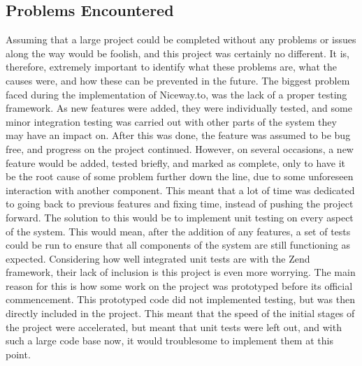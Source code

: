 \subsection{Problems Encountered}
\label{sec:problems}
Assuming that a large project could be completed without any problems or issues along the way would be foolish, and this project was certainly no different. It is, therefore, extremely important to identify what these problems are, what the causes were, and how these can be prevented in the future. The biggest problem faced during the implementation of Niceway.to, was the lack of a proper testing framework. As new features were added, they were individually tested, and some minor integration testing was carried out with other parts of the system they may have an impact on. After this was done, the feature was assumed to be bug free, and progress on the project continued. However, on several occasions, a new feature would be added, tested briefly, and marked as complete, only to have it be the root cause of some problem further down the line, due to some unforeseen interaction with another component. This meant that a lot of time was dedicated to going back to previous features and fixing time, instead of pushing the project forward. The solution to this would be to implement unit testing on every aspect of the system. This would mean, after the addition of any features, a set of tests could be run to ensure that all components of the system are still functioning as expected. Considering how well integrated unit tests are with the Zend framework, their lack of inclusion is this project is even more worrying. The main reason for this is how some work on the project was prototyped before its official commencement. This prototyped code did not implemented testing, but was then directly included in the project. This meant that the speed of the initial stages of the project were accelerated, but meant that unit tests were left out, and with such a large code base now, it would troublesome to implement them at this point.\ \\
\ \\
